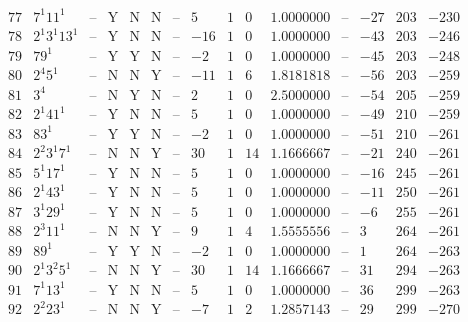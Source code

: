 \documentclass[11pt,reqno,a4letter]{article}
\numberwithin{figure}{section}
\numberwithin{table}{section}
\theoremstyle{plain}
\numberwithin{theorem}{section}
\theoremstyle{definition}
\begin{document}
\begin{table}[h!]
\begin{equation*}
{\begin{array}{|cc|c|ccc|c|c|ccc|c|ccc}
 77 & 7^1 11^1 & \text{--} & \text{Y} & \text{N} & \text{N} & \text{--} & 5 & 1 & 0 & 1.0000000 & \text{--} & -27 & 203 & -230 \\
 78 & 2^1 3^1 13^1 & \text{--} & \text{Y} & \text{N} & \text{N} & \text{--} & -16 & 1 & 0 & 1.0000000 & \text{--} & -43 & 203 & -246 \\
 79 & 79^1 & \text{--} & \text{Y} & \text{Y} & \text{N} & \text{--} & -2 & 1 & 0 & 1.0000000 & \text{--} & -45 & 203 & -248 \\
 80 & 2^4 5^1 & \text{--} & \text{N} & \text{N} & \text{Y} & \text{--} & -11 & 1 & 6 & 1.8181818 & \text{--} & -56 & 203 & -259 \\
 81 & 3^4 & \text{--} & \text{N} & \text{Y} & \text{N} & \text{--} & 2 & 1 & 0 & 2.5000000 & \text{--} & -54 & 205 & -259 \\
 82 & 2^1 41^1 & \text{--} & \text{Y} & \text{N} & \text{N} & \text{--} & 5 & 1 & 0 & 1.0000000 & \text{--} & -49 & 210 & -259 \\
 83 & 83^1 & \text{--} & \text{Y} & \text{Y} & \text{N} & \text{--} & -2 & 1 & 0 & 1.0000000 & \text{--} & -51 & 210 & -261 \\
 84 & 2^2 3^1 7^1 & \text{--} & \text{N} & \text{N} & \text{Y} & \text{--} & 30 & 1 & 14 & 1.1666667 & \text{--} & -21 & 240 & -261 \\
 85 & 5^1 17^1 & \text{--} & \text{Y} & \text{N} & \text{N} & \text{--} & 5 & 1 & 0 & 1.0000000 & \text{--} & -16 & 245 & -261 \\
 86 & 2^1 43^1 & \text{--} & \text{Y} & \text{N} & \text{N} & \text{--} & 5 & 1 & 0 & 1.0000000 & \text{--} & -11 & 250 & -261 \\
 87 & 3^1 29^1 & \text{--} & \text{Y} & \text{N} & \text{N} & \text{--} & 5 & 1 & 0 & 1.0000000 & \text{--} & -6 & 255 & -261 \\
 88 & 2^3 11^1 & \text{--} & \text{N} & \text{N} & \text{Y} & \text{--} & 9 & 1 & 4 & 1.5555556 & \text{--} & 3 & 264 & -261 \\
 89 & 89^1 & \text{--} & \text{Y} & \text{Y} & \text{N} & \text{--} & -2 & 1 & 0 & 1.0000000 & \text{--} & 1 & 264 & -263 \\
 90 & 2^1 3^2 5^1 & \text{--} & \text{N} & \text{N} & \text{Y} & \text{--} & 30 & 1 & 14 & 1.1666667 & \text{--} & 31 & 294 & -263 \\
 91 & 7^1 13^1 & \text{--} & \text{Y} & \text{N} & \text{N} & \text{--} & 5 & 1 & 0 & 1.0000000 & \text{--} & 36 & 299 & -263 \\
 92 & 2^2 23^1 & \text{--} & \text{N} & \text{N} & \text{Y} & \text{--} & -7 & 1 & 2 & 1.2857143 & \text{--} & 29 & 299 & -270 \\

\end{array}}
\end{equation*}
\end{table}
\end{document}
